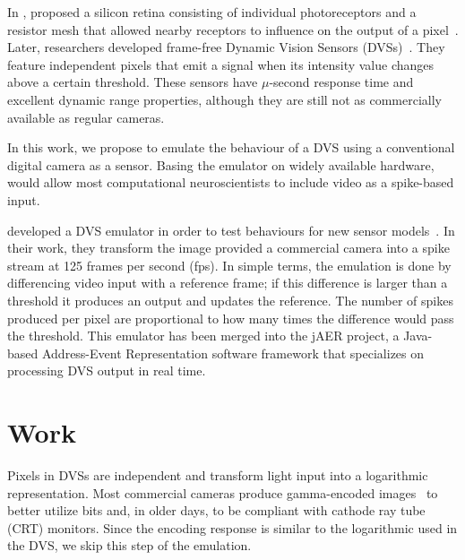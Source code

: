 \documentclass[twocolumn]{article}
\begin{document}
In \citeyear{Mead1989}, \citeauthor{Mead1989} proposed a silicon retina consisting of individual photoreceptors and a resistor mesh that allowed nearby receptors to influence on the output of a pixel~\cite{Mead1989}. 
Later, researchers developed frame-free Dynamic Vision Sensors (DVSs)~\cite{delbruck_dvs,bernabe_dvs}. They feature independent pixels that emit a signal when its intensity value changes above a certain threshold. These sensors have $\mu$-second response time and excellent dynamic range properties, although they are still not as commercially available as regular cameras.

In this work, we propose to emulate the behaviour of a DVS using a conventional digital camera as a sensor. Basing the emulator on widely available hardware, would allow most computational neuroscientists to include video as a spike-based input.


\citeauthor{dvs_emu} developed a DVS emulator in order to test behaviours for new sensor models~\cite{dvs_emu}. In their work, they transform the image provided a commercial camera into a spike stream at 125 frames per second (fps). In simple terms, the emulation is done by differencing video input with a reference frame; if this difference is larger than a threshold it produces an output and updates the reference. The number of spikes produced per pixel are proportional to how many times the difference would pass the threshold. This emulator has been merged into the jAER project, a Java-based Address-Event Representation software framework that specializes on processing DVS output in real time.


\section{Work}

Pixels in DVSs are independent and transform light input into a logarithmic representation. Most commercial cameras produce gamma-encoded images~\cite{Poynton_digital_video} to better utilize bits and, in older days, to be compliant with cathode ray tube (CRT) monitors.
Since the encoding response is similar to the logarithmic used in the DVS, we skip this step of the emulation.
\end{document}
